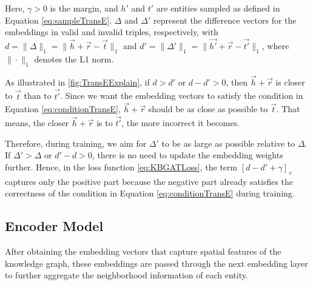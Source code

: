 Here, $\gamma > 0$ is the margin, and $h'$ and $t'$ are entities sampled as defined in Equation \ref{eq:sampleTransE}. $\Delta$ and $\Delta'$ represent the difference vectors for the embeddings in valid and invalid triples, respectively, with $d = \big\|\Delta \big\|_{1} = \big\| \overrightarrow{h} + \overrightarrow{r} - \overrightarrow{t} \big\|_{1}$ and $d' = \big\|\Delta' \big\|_{1} = \big\| \overrightarrow{h'} + \overrightarrow{r} - \overrightarrow{t'} \big\|_{1}$, where $\|\cdot\|_{1}$ denotes the L1 norm.

As illustrated in \autoref{fig:TransEExplain}, if $d > d'$ or $d - d' > 0$, then $\overrightarrow{h} + \overrightarrow{r}$ is closer to $\overrightarrow{t}$ than to $\overrightarrow{t'}$. Since we want the embedding vectors to satisfy the condition in Equation \ref{eq:conditionTransE}, $\overrightarrow{h} + \overrightarrow{r}$ should be as close as possible to $\overrightarrow{t}$. That means, the closer $\overrightarrow{h} + \overrightarrow{r}$ is to $\overrightarrow{t'}$, the more incorrect it becomes.

Therefore, during training, we aim for $\Delta'$ to be as large as possible relative to $\Delta$. If $\Delta' > \Delta$ or $d' - d > 0$, there is no need to update the embedding weights further. Hence, in the loss function \ref{eq:KBGATLoss}, the term $[d - d' + \gamma]_{+}$ captures only the positive part because the negative part already satisfies the correctness of the condition in Equation \ref{eq:conditionTransE} during training.



\subsection{Encoder Model}
\label{sec:encodeKBGAT}

After obtaining the embedding vectors that capture spatial features of the knowledge graph, these embeddings are passed through the next embedding layer to further aggregate the neighborhood information of each entity.


